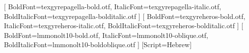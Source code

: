 \newcommand{\BookAuthor}{R. EverStarine}
\providecommand{\BookStatus}{框架预览·正文未撰写}

\usepackage[a4paper,inner=28mm,outer=24mm,top=27mm,bottom=28mm,
  headheight=16pt,headsep=8mm,footskip=12mm]{geometry}

\usepackage{amsmath}
\usepackage{mathtools}
\usepackage{amsthm}
\usepackage{aliascnt}
\usepackage{unicode-math}
\setmainfont{texgyrepagella-regular.otf}[
  BoldFont=texgyrepagella-bold.otf,
  ItalicFont=texgyrepagella-italic.otf,
  BoldItalicFont=texgyrepagella-bolditalic.otf
]
\setsansfont{texgyreheros-regular.otf}[
  BoldFont=texgyreheros-bold.otf,
  ItalicFont=texgyreheros-italic.otf,
  BoldItalicFont=texgyreheros-bolditalic.otf
]
\setmonofont{lmmonolt10-regular.otf}[
  BoldFont=lmmonolt10-bold.otf,
  ItalicFont=lmmonolt10-oblique.otf,
  BoldItalicFont=lmmonolt10-boldoblique.otf
]
\newfontfamily{}
\newCJKfontfamily{}
\newfontfamily{}[Script=Hebrew]
\let\mathbb\relax
\DeclareMathAlphabet{\mathbb}{U}{msb}{m}{n}
\AtBeginDocument{%
  \let\varnothing\GeometryRoundEmptySet
  \let\emptyset\GeometryRoundEmptySet
  \let\pitchfork\GeometryTransverse
}

